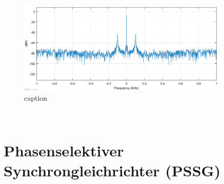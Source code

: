 ~\\
\begin{figure}[h]
  \centering
  \includegraphics[width=0.9\textwidth]{./img/ch6/6_3_4_mitTischleuchte_mitDeckenleuchte}
  \caption{caption}  
\end{figure} 
~\\
\section{Phasenselektiver Synchrongleichrichter (PSSG)}

